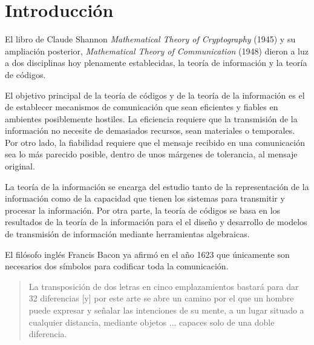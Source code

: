 \chapter*{Introducción}
 
El libro de Claude Shannon \textit{Mathematical Theory of Cryptography} (1945) y su ampliación posterior, \textit{Mathematical Theory of Communication} (1948) dieron a luz a dos disciplinas hoy plenamente establecidas, la teoría de información y la teoría de códigos.

El objetivo principal de la teoría de códigos y de la teoría de la información es el de establecer mecanismos de comunicación que sean eficientes y fiables en ambientes posiblemente hostiles.
La eficiencia requiere que la transmisión de la información no necesite de demasiados recursos, sean materiales o temporales.
Por otro lado, la fiabilidad requiere que el mensaje recibido en una comunicación sea lo más parecido posible, dentro de unos márgenes de tolerancia, al mensaje original.

La teoría de la información se encarga del estudio tanto de la representación de la información como de la capacidad que tienen los sistemas para transmitir y procesar la información. 
Por otra parte, la teoría de códigos se basa en los resultados de la teoría de la información para el el diseño y desarrollo de modelos de transmisión de información mediante herramientas algebraicas.

El filósofo inglés Francis Bacon ya afirmó en el año 1623 que únicamente son necesarios dos símbolos para codificar toda la comunicación.

\blockquote[{\cite[30]{dyson_catedral_2015}}]{La transposición de dos letras en cinco emplazamientos bastará para dar 32 diferencias [y] por este arte se abre un camino por el que un hombre puede expresar y señalar las intenciones de su mente, a un lugar situado a cualquier distancia, mediante objetos ... capaces solo de una doble diferencia.}
